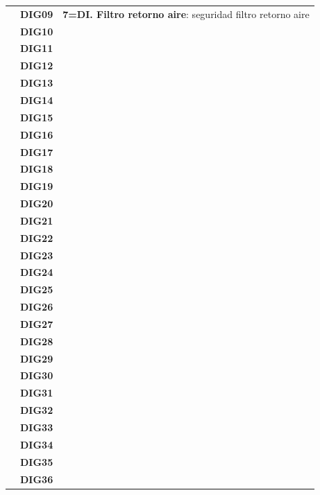 \begin{center}
\begin{longtable}{|p{3cm}|p{3cm}|p{9cm}|}
      & \centering\textbf{DIG09} & \footnotesize{\textbf{7=DI. Filtro retorno aire}: seguridad filtro retorno aire} \\ \cline{2-2}
      & \centering\textbf{DIG10} &  \\ \cline{2-2}
      & \centering\textbf{DIG11} &  \\ \cline{2-2}
      & \centering\textbf{DIG12} &  \\ \cline{2-2}
      & \centering\textbf{DIG13} &  \\ \cline{2-2}
      & \centering\textbf{DIG14} &  \\ \cline{2-2}
      & \centering\textbf{DIG15} &  \\ \cline{2-2}
      & \centering\textbf{DIG16} &  \\ \cline{2-2}
      & \centering\textbf{DIG17} &  \\ \cline{2-2}
      & \centering\textbf{DIG18} &  \\ \cline{2-2}
      & \centering\textbf{DIG19} &  \\ \cline{2-2}
      & \centering\textbf{DIG20} &  \\ \cline{2-2}
      & \centering\textbf{DIG21} &  \\ \cline{2-2}
      & \centering\textbf{DIG22} &  \\ \cline{2-2}
      & \centering\textbf{DIG23} &  \\ \cline{2-2}
      & \centering\textbf{DIG24} &  \\ \cline{2-2}
      & \centering\textbf{DIG25} &  \\ \cline{2-2}
      & \centering\textbf{DIG26} &  \\ \cline{2-2}
      & \centering\textbf{DIG27} &  \\ \cline{2-2}
      & \centering\textbf{DIG28} &  \\ \cline{2-2}
      & \centering\textbf{DIG29} &  \\ \cline{2-2}
      & \centering\textbf{DIG30} &  \\ \cline{2-2}
      & \centering\textbf{DIG31} &  \\ \cline{2-2}
      & \centering\textbf{DIG32} &  \\ \cline{2-2}
      & \centering\textbf{DIG33} &  \\ \cline{2-2}
      & \centering\textbf{DIG34} &  \\ \cline{2-2}
      & \centering\textbf{DIG35} &  \\ \cline{2-2}
      & \centering\textbf{DIG36} &  \\ \cline{2-2}

\end{longtable}
\end{center}
